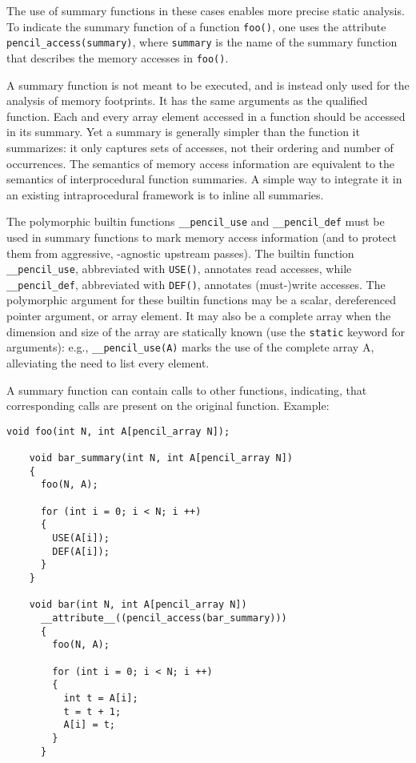   The use of summary functions in these cases enables more
  precise static analysis.
  To indicate the summary function of a function \lstinline!foo()!,
  one uses the attribute
  \lstinline!pencil_access(summary)!, where
  \lstinline!summary! is the name of the summary function
  that describes the memory accesses in \lstinline!foo()!.

  A summary function is not meant to be executed, and is instead only used
  for the analysis of memory footprints.
  It has the same arguments as the qualified function.
  Each and every array element accessed in a function should be accessed
  in its summary. Yet a summary is generally simpler than the function
  it summarizes: it only captures sets of accesses, not their ordering
  and number of occurrences.
  The semantics of memory access information are equivalent to the semantics
  of interprocedural function summaries.  A simple way to integrate
  it in an existing intraprocedural framework is to inline all
  summaries.

  The polymorphic builtin functions \lstinline!__pencil_use!
  and \lstinline!__pencil_def! must be used in summary
  functions to mark memory access information (and to protect them
  from aggressive, \pencil-agnostic upstream passes).
  The builtin function \lstinline!__pencil_use!, abbreviated with
  \lstinline!USE()!, annotates read accesses, while \lstinline!__pencil_def!,
  abbreviated with \lstinline!DEF()!, annotates (must-)write accesses.
  The polymorphic argument for these builtin functions may be a scalar,
  dereferenced pointer argument, or array element. It may also be a
  complete array when the dimension and size of the array are
  statically known (use the \lstinline!static! keyword for
  arguments): e.g., \lstinline!__pencil_use(A)! marks the use of the
  complete array A, alleviating the need to list every
  element.
  
  A summary function can contain calls to other functions, indicating,
  that corresponding calls are present on the original function.  Example:

  \begin{lstlisting}[language=pencil]
    void foo(int N, int A[pencil_array N]);

    void bar_summary(int N, int A[pencil_array N])
    {
      foo(N, A);

      for (int i = 0; i < N; i ++)
      {
        USE(A[i]);
        DEF(A[i]);
      }
    }

    void bar(int N, int A[pencil_array N])
      __attribute__((pencil_access(bar_summary)))
      {
        foo(N, A);

        for (int i = 0; i < N; i ++)
        {
          int t = A[i];
          t = t + 1;
          A[i] = t;
        }
      }
  \end{lstlisting}
  
